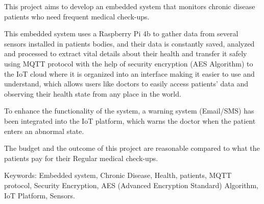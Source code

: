 This project aims to develop an embedded system that monitors chronic disease patients who need frequent medical check-\/ups.

This embedded system uses a Raspberry Pi 4b to gather data from several sensors installed in patients\textquotesingle{} bodies, and their data is constantly saved, analyzed and processed to extract vital details about their health and transfer it safely using MQTT protocol with the help of security encryption (AES Algorithm) to the IoT cloud where it is organized into an interface making it easier to use and understand, which allows users like doctors to easily access patients’ data and observing their health state from any place in the world.

To enhance the functionality of the system, a warning system (Email/\+SMS) has been integrated into the IoT platform, which warns the doctor when the patient enters an abnormal state.

The budget and the outcome of this project are reasonable compared to what the patients pay for their Regular medical check-\/ups.

Keywords\+: Embedded system, Chronic Disease, Health, patients, MQTT protocol, Security Encryption, AES (Advanced Encryption Standard) Algorithm, IoT Platform, Sensors. 